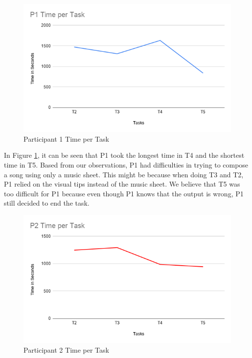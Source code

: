 \begin{figure}[H]
    \centering
    \includegraphics[width=15cm]{figures/Results/P1Time.png}
    \caption{Participant 1 Time per Task}
    \label{fig:P1Time}
\end{figure}

In Figure \ref{fig:P1Time}, it can be seen that P1 took the longest time in T4 and the shortest time in T5. Based from our observations, P1 had difficulties in trying to compose a song using only a music sheet. This might be because when doing T3 and T2, P1 relied on the visual tips instead of the music sheet. We believe that T5 was too difficult for P1 because even though P1 knows that the output is wrong, P1 still decided to end the task.

\begin{figure}[H]
    \centering
    \includegraphics[width=15cm]{figures/Results/P2Time.png}
    \caption{Participant 2 Time per Task}
    \label{fig:P2Time}
\end{figure}

